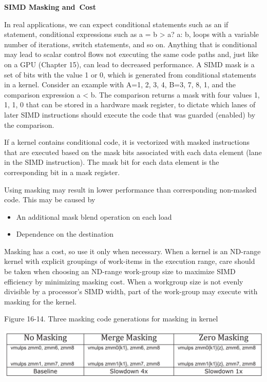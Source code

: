\hspace*{\fill} \par %
\textbf{SIMD Masking and Cost}

In real applications, we can expect conditional statements such as an if statement, conditional expressions such as a = b > a? a: b, loops with a variable number of iterations, switch statements, and so on. Anything that is conditional may lead to scalar control flows not executing the same code paths and, just like on a GPU (Chapter 15), can lead to decreased performance. A SIMD mask is a set of bits with the value 1 or 0, which is generated from conditional statements in a kernel. Consider an example with A={1, 2, 3, 4}, B={3, 7, 8, 1}, and the comparison expression a < b. The comparison returns a mask with four values {1, 1, 1, 0} that can be stored in a hardware mask register, to dictate which lanes of later SIMD instructions should execute the code that was guarded (enabled) by the comparison.\par

If a kernel contains conditional code, it is vectorized with masked instructions that are executed based on the mask bits associated with each data element (lane in the SIMD instruction). The mask bit for each data element is the corresponding bit in a mask register.\par

Using masking may result in lower performance than corresponding 
non-masked code. This may be caused by\par

\begin{itemize}
	\item An additional mask blend operation on each load
	\item Dependence on the destination
\end{itemize}

Masking has a cost, so use it only when necessary. When a kernel is an ND-range kernel with explicit groupings of work-items in the execution range, care should be taken when choosing an ND-range work-group size to maximize SIMD efficiency by minimizing masking cost. When a workgroup  size is not evenly divisible by a processor’s SIMD width, part of the work-group may execute with masking for the kernel.\par

\hspace*{\fill} \par %
Figure 16-14. Three masking code generations for masking in kernel
\begin{center}
	\includegraphics[width=1.0\textwidth]{content/chapter-16/images/11}
\end{center}

